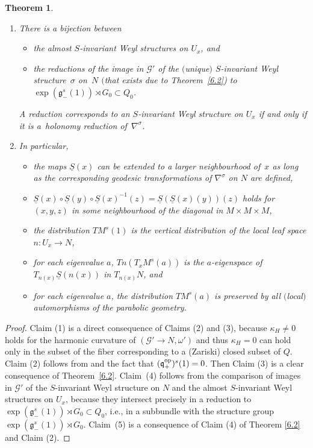 \documentclass[10pt,a4paper]{amsart}
\newcommand{\om}{\omega}
\newcommand{\si}{\sigma}
\newcommand{\un}{\underline}
\newcommand{\ba}{\mathcal{G}}
\newcommand{\fg}{\mathfrak g}
\newcommand{\fv}{\mathfrak q}
\newcommand{\fp}{\mathfrak p}
\newcommand{\fl}{\mathfrak l}
\numberwithin{equation}{section}
\newtheorem{Theorem}{Theorem}[section]
\begin{document}
\begin{Theorem}
\begin{enumerate}
The pseudo-group generated by all local $s$-symmetries is locally transitive at $x$ if and only if $\fv/\fp\subset \fl/(\fl\cap \fp)$, i.e., if and only if $(R^\si(n(x)))_\si$ spans the whole $\fv/\fp$.
\item[$4.$] There is a bijection between
\begin{itemize}\itemsep=0pt
\item the almost $S$-invariant Weyl structures on $U_x$, and
\item the reductions of the image in $\ba'$ of the $($unique$)$ $S$-invariant Weyl structure~$\si$ on~$N$ $($that exists due to Theorem~{\rm \ref{6.2})} to $\exp(\fg_-^s(1))\rtimes G_0\subset Q_0$.
\end{itemize}
A reduction corresponds to an $S$-invariant Weyl structure on $U_x$ if and only if it is a~holonomy reduction of~$\nabla^\si$.
\item[$5.$] In particular,
\begin{itemize}\itemsep=0pt
\item the maps $\un S(x)$ can be extended to a larger neighbourhood of~$x$ as long as the corresponding geodesic transformations of $\nabla^\si$ on $N$ are defined,
\item $\un S(x)\circ \un S(y)\circ \un S(x)^{-1}(z)=\un S({\un S(x)(y)})(z)$ holds for $(x,y,z)$ in some neighbourhood of the diagonal in $M\times M\times M$,
\item the distribution $TM^s(1)$ is the vertical distribution of the local leaf space $n\colon U_x\to N$,
\item for each eigenvalue $a$, $Tn(T_xM^s(a))$ is the $a$-eigenspace of $T_{n(x)}\un S(n(x))$ in $T_{n(x)}N$, and
\item for each eigenvalue $a$, the distribution $TM^s(a)$ is preserved by all $($local$)$ automorphisms of the parabolic geometry.
\end{itemize}
\end{enumerate}
\end{Theorem}
\begin{proof}
Claim (1) is a direct consequence of Claims (2) and (3), because $\kappa_H\neq 0$ holds for the harmonic curvature of $(\ba'\to N,\om')$ and thus $\kappa_H=0$ can hold only in the subset of the f\/iber corresponding to a (Zariski) closed subset of $Q$. Claim (2) follows from \cite[Theorem~3.3]{cap-cor} and the fact that $(\fv^{\rm op}_+)^s(1)=0$. Then Claim (3) is a clear consequence of Theorem~\ref{6.2}. Claim~(4) follows from the comparison of images in $\ba'$ of the $S$-invariant Weyl structure on $N$ and the almost $S$-invariant Weyl structures on $U_x$, because they intersect precisely in a reduction to $\exp(\fg_-^s(1))\rtimes G_0\subset Q_0$, i.e., in a subbundle with the structure group $\exp(\fg_-^s(1))\rtimes G_0$. Claim~(5) is a consequence of Claim (4) of Theorem \ref{6.2} and Claim (2).
\end{proof}
\end{document}
